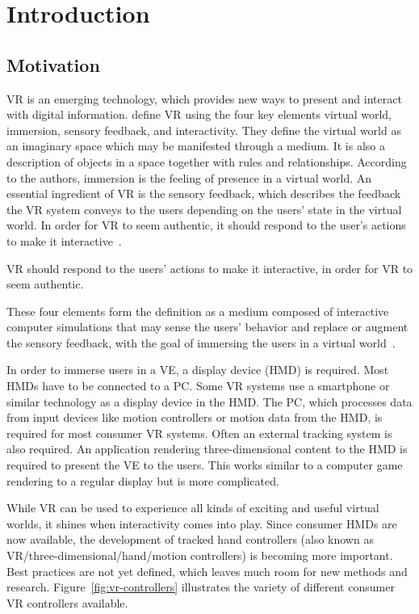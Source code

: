 \chapter{Introduction}\label{chapter:introduction}

\section{Motivation}\label{section:motivation}

\gls{VR} is an emerging technology, which provides new ways to present and interact with digital information. \citeauthor{Sherman.2003} define \gls{VR} using the four key elements virtual world, immersion, sensory feedback, and interactivity. They define the virtual world as an imaginary space which may be manifested through a medium. It is also a description of objects in a space together with rules and relationships. According to the authors, immersion is the feeling of presence in a virtual world. An essential ingredient of \gls{VR} is the sensory feedback, which describes the feedback the \gls{VR} system conveys to the users depending on the users' state in the virtual world. In order for \gls{VR} to seem authentic, it should respond to the user's actions to make it interactive~\cite[6-13]{Sherman.2003}.

\gls{VR} should respond to the users' actions to make it interactive, in order for \gls{VR} to seem authentic.

These four elements form the definition as a medium composed of interactive computer simulations that may sense the users' behavior and replace or augment the sensory feedback, with the goal of immersing the users in a virtual world~\cite[13-14]{Sherman.2003}.

In order to immerse users in a \gls{VE}, a display device (\gls{HMD}) is required. Most \glspl{HMD} have to be connected to a \gls{PC}. Some \gls{VR} systems use a smartphone or similar technology as a display device in the \gls{HMD}. The \gls{PC}, which processes data from input devices like motion controllers or motion data from the \gls{HMD}, is required for most consumer \gls{VR} systems. Often an external tracking system is also required. An application rendering three-dimensional content to the \gls{HMD} is required to present the \gls{VE} to the users. This works similar to a computer game rendering to a regular display but is more complicated.

While \gls{VR} can be used to experience all kinds of exciting and useful virtual worlds, it shines when interactivity comes into play. Since consumer \glspl{HMD} are now available, the development of tracked hand controllers (also known as \gls{VR}/three-dimensional/hand/motion controllers) is becoming more important.
Best practices are not yet defined, which leaves much room for new methods and research. Figure~\ref{fig:vr-controllers} illustrates the variety of different consumer \gls{VR} controllers available.

